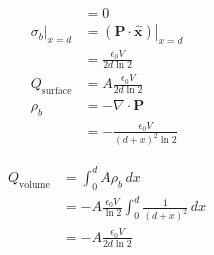 \documentclass{article}
\renewcommand{\vec}[1]{\boldsymbol{\mathbf{#1}}}
\newcommand{\uvec}[1]{\hat{\vec{#1}}}
\begin{document}
\begin{align*}
                                  & = 0                                                              \\
  \left. \sigma_b \right|_{x = d} & = \left. (\vec{P} \cdot \uvec{x}) \right|_{x = d}                \\
                                  & = \frac{\epsilon_0 V}{2 d \ln 2}                                 \\
  Q_\text{surface}                & = A \frac{\epsilon_0 V}{2 d \ln 2}                               \\
  \rho_b                          & = -\nabla \cdot \vec{P}                                          \\
                                  & = -\frac{\epsilon_0 V}{(d + x)^2 \ln 2}
\end{align*}

\begin{align*}
  Q_\text{volume} & = \int_0^d A \rho_b \,d x                                          \\
                  & = -A \frac{\epsilon_0 V}{\ln 2} \int_0^d \frac{1}{(d + x)^2} \,d x \\
                  & = -A \frac{\epsilon_0 V}{2 d \ln 2}
\end{align*}

\subsection{}
\end{document}
